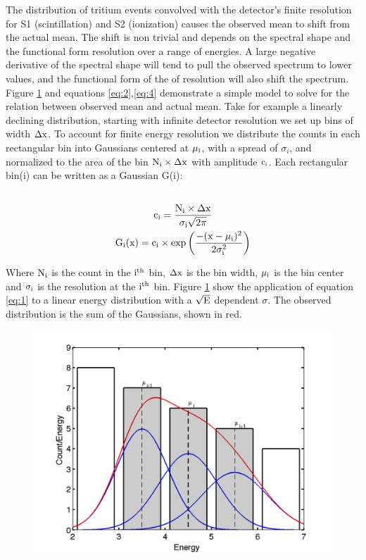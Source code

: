 The distribution of tritium events convolved with the detector's finite resolution for S1 (scintillation) and S2 (ionization) causes the observed mean to shift from the actual mean. The shift is non trivial and depends on the spectral shape and the functional form resolution over a range of energies. A large negative derivative of the spectral shape will tend to pull the observed spectrum to lower values, and the functional form of the of resolution will also shift the spectrum. Figure \ref{fig:exp_int} and equations \ref{eq:2},\ref{eq:4} demonstrate a simple model to solve for the relation between observed mean and actual mean. Take for example a linearly declining distribution, starting with infinite detector resolution we set up bins of width $\rm \Delta x$. To account for finite energy resolution we distribute the counts in each rectangular bin into Gaussians centered at $\rm \mu_i$, with a spread of $\sigma_i$, and normalized to the area of the bin $\rm N_i \times \Delta x $ with amplitude $\rm c_i$. Each rectangular bin(i) can be written as a Gaussian G(i): \\ 
\begin{multline}
\\ \rm c_i=\frac{N_i \times \Delta x}{\sigma_i\sqrt{2\pi}} \\
\rm G_{i}(x) = c_i \times exp\left(\frac{-(x-\mu_i)^2}{2\sigma_i^2}\right)\\
\label{eq:1}
\end{multline}


Where $\rm N_i$ is the count in the $\rm i^{th}$ bin, $\rm \Delta x$ is the bin width, $\rm \mu_i$ is the bin center and $\rm \sigma_i$ is the resolution at the $\rm i^{th}$ bin. Figure \ref{fig:exp_int} show the application of equation \ref{eq:1} to a linear energy distribution with a $\rm \sqrt{E}$ dependent $\sigma$. The observed distribution is the sum of the Gaussians, shown in red.

 \begin{figure}[h!]\centering
\includegraphics[width=130mm]{Recombination_LY_QY/Figures/example_integral}
\caption{}
\label{fig:exp_int}
\end{figure}


